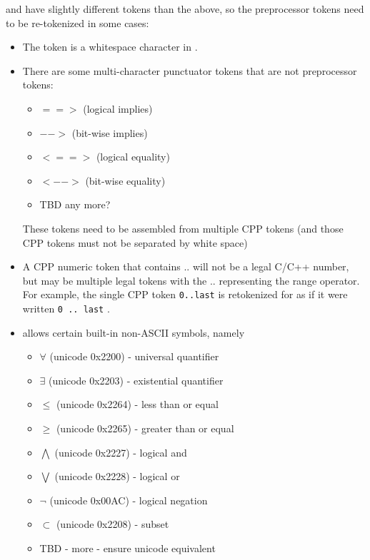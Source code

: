 \acsl and \acslpp have slightly different tokens than the above, so the preprocessor tokens need to be re-tokenized in some cases:
\begin{itemize}
	\item The \@ token is a whitespace character in \acslb.
	\item There are some \acslb multi-character punctuator tokens that are not
	preprocessor tokens:
	\begin{itemize}
		\item[] $==>$ (logical implies)
		\item[] $-->$ (bit-wise implies)
		\item[] $<==>$ (logical equality)
		\item[] $<-->$ (bit-wise equality)
		\item[] TBD any more?
	\end{itemize}
	These \acslb tokens need to be assembled from multiple CPP tokens (and those CPP tokens must not be separated by white space)
	\item A CPP numeric token that contains .. will not be a legal C/C++ number, but may be multiple legal \acslb tokens with the .. representing the range operator.  For example, the single CPP token \texttt{0..last} is retokenized for \acslb as if it were written \texttt{0 .. last} .
	\item \acslb allows certain built-in non-ASCII symbols, namely
	\begin{itemize}
		\item[] $\forall$ (unicode 0x2200) - universal quantifier
		\item[] $\exists$ (unicode 0x2203) - existential quantifier
		\item[] $\leq$ (unicode 0x2264) - less than or equal
		\item[] $\geq$ (unicode 0x2265) - greater than or equal
		\item[] $\bigwedge$ (unicode 0x2227) - logical and
		\item[] $\bigvee$ (unicode 0x2228) - logical or
		\item[] $\neg$ (unicode 0x00AC) - logical negation
		\item[] $\subset$ (unicode 0x2208) - subset
		\item TBD - more - ensure unicode equivalent
	\end{itemize}
\end{itemize}

